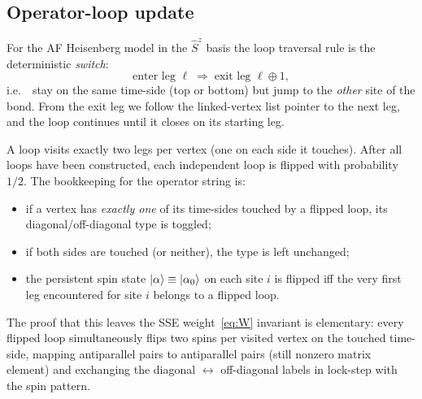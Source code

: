 \documentclass[11pt,a4paper]{article}
\newcommand{\ie}{i.e.\ }
\newcommand{\Sz}{\hat S^z}
\theoremstyle{definition}
\theoremstyle{plain}
\begin{document}
\subsection{Operator-loop update}\label{sec:loop-update}
For the AF Heisenberg model in the $\Sz$ basis the loop traversal
rule is the deterministic \emph{switch}:
\begin{equation}\label{eq:switch}
    \text{enter leg } \ell \;\Longrightarrow\;
    \text{exit leg } \ell\oplus 1 ,
\end{equation}
\ie\ stay on the same time-side (top or bottom) but jump to the
\emph{other} site of the bond. From the exit leg we follow the
linked-vertex list pointer to the next leg, and the loop continues
until it closes on its starting leg.

A loop visits exactly two legs per vertex (one on each side it
touches). After all loops have been constructed, each independent
loop is flipped with probability $1/2$. The bookkeeping for the
operator string is:
\begin{itemize}
    \item if a vertex has \emph{exactly one} of its time-sides
          touched by a flipped loop, its diagonal/off-diagonal type
          is toggled;
    \item if both sides are touched (or neither), the type is left
          unchanged;
    \item the persistent spin state $\ket\alpha\equiv\ket{\alpha_0}$
          on each site $i$ is flipped iff the very first leg
          encountered for site $i$ belongs to a flipped loop.
\end{itemize}
The proof that this leaves the SSE weight~\cref{eq:W} invariant is
elementary: every flipped loop simultaneously flips two spins per
visited vertex on the touched time-side, mapping antiparallel pairs
to antiparallel pairs (still nonzero matrix element) and exchanging
the diagonal $\leftrightarrow$ off-diagonal labels in lock-step with
the spin pattern.
\end{document}
